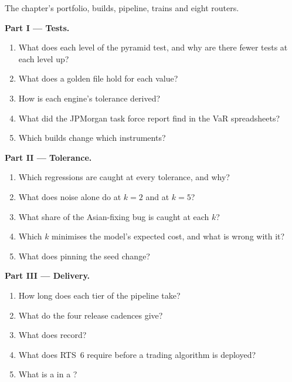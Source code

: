 \begin{problem}\label{pb:pl:testing-and-continuous-delivery:1}
The chapter's portfolio, builds, pipeline, trains and eight routers.

\medskip\noindent\textbf{Part I --- Tests.}
\begin{enumerate}
\item What does each level of the pyramid test, and why are there fewer tests at each level up?
\item What does a golden file hold for each value?
\item How is each engine's tolerance derived?
\item What did the JPMorgan task force report find in the VaR spreadsheets?
\item Which builds change which instruments?
\end{enumerate}

\medskip\noindent\textbf{Part II --- Tolerance.}
\begin{enumerate}[resume]
\item Which regressions are caught at every tolerance, and why?
\item What does noise alone do at $k=2$ and at $k=5$?
\item What share of the Asian-fixing bug is caught at each $k$?
\item Which $k$ minimises the model's expected cost, and what is wrong with it?
\item What does pinning the seed change?
\end{enumerate}

\medskip\noindent\textbf{Part III --- Delivery.}
\begin{enumerate}[resume]
\item How long does each tier of the pipeline take?
\item What do the four release cadences give?
\item What does  record?
\item What does RTS~6 require before a trading algorithm is deployed?
\item What is a  in a ?
\end{enumerate}


\end{problem}
